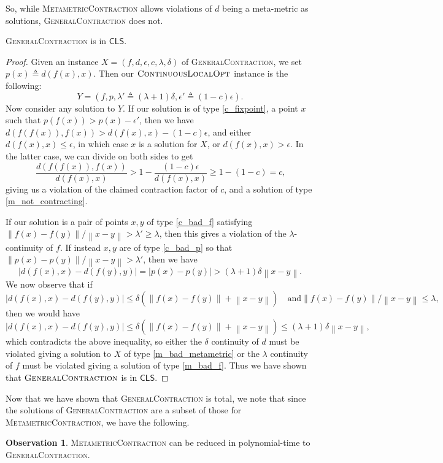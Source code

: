 \documentclass[a4paper,UKenglish]{lipics2}
\theoremstyle{definition}
\newtheorem{observation}[theorem]{Observation}
\def\cc#1{\mathsf{#1}}
\def\CLS{\ensuremath{\cc{CLS}}\xspace}
\def\problem#1{\textsc{#1}}
\def\GCM{\problem{GeneralContraction}\xspace}
\def\MMCM{\problem{MetametricContraction}\xspace}
\def\CLO{\problem{ContinuousLocalOpt}\xspace}
\def\e{\epsilon}
\def\Abs#1{\left| #1 \right|}
\def\Norm#1{\left\| #1 \right\|}
\begin{document}
So, while \MMCM allows violations of $d$ being a meta-metric
as solutions, \GCM does not. 

\begin{theorem}
\label{thm:GCMinCLS}
  \GCM is in \CLS.
\end{theorem}
\begin{proof}
  Given an instance $X=(f,d,\e,c,\lambda,\delta)$ of \GCM, we set $p(x) \triangleq d(f(x),x)$. Then our $\CLO$ instance is the following:
  \[Y=(f, p, \lambda' \triangleq (\lambda + 1) \delta, \e' \triangleq (1-c)\e).\]
%
Now consider any solution to $Y$. If our solution is of type \ref{c_fixpoint}, a
	point $x$ such that $p(f(x)) > p(x) - \e'$, then we have $d(f(f(x)),f(x))
	> d(f(x),x) - (1-c)\e$, and either $d(f(x),x) \leq \e$, in which case $x$ is
	a solution for $X$, or $d(f(x),x) > \e$. In the latter case, we can divide
	on both sides to get \[ \frac{d(f(f(x)),f(x))}{d(f(x),x)} > 1-
	\frac{(1-c)\e}{d(f(x),x)} \geq 1- (1-c) = c\text{,} \] giving us a violation
	of the claimed contraction factor of $c$, and a solution of type
	\ref{m_not_contracting}.

If our solution is a pair of points $x,y$ of type \ref{c_bad_f} satisfying $\Norm{f(x) - f(y)}/\Norm{x-y} > \lambda' \geq \lambda$, then this gives a violation of the $\lambda$-continuity of $f$. If instead $x,y$ are of type \ref{c_bad_p} so that $\Norm{p(x) - p(y)}/\Norm{x-y} > \lambda'$, then we have
\[ \Abs{d(f(x),x) - d(f(y),y)} = \Abs{p(x) - p(y)} > (\lambda+1)\delta \Norm{x-y}\text{.} \]
%  
We now observe that if
\[ \Abs{d(f(x),x) - d(f(y),y)} \leq \delta (\Norm{f(x)-f(y)} + \Norm{x - y}) \quad \text{and} \Norm{f(x) - f(y)}/\Norm{x-y} \leq \lambda,\] 
	then we would have
\[\Abs{d(f(x),x) - d(f(y),y)} \leq \delta (\Norm{f(x) - f(y)} + \Norm{x-y}) \leq (\lambda + 1)\delta \Norm{x-y},\] 
which contradicts the above inequality, so either the $\delta$ continuity of $d$ must be violated giving a solution to $X$ of type \ref{m_bad_metametric} or the $\lambda$ continuity of $f$ must be violated giving a solution of type \ref{m_bad_f}.
%
Thus we have shown that $\GCM$ is in $\CLS$.
\end{proof}

Now that we have shown that \GCM is total, we note 
that since the solutions of \GCM are a subset of those for \MMCM, we have the following.

\begin{observation}
\label{obs:MMCMtoGCM}
\MMCM can be reduced in polynomial-time to \GCM.
\end{observation}
\end{document}
